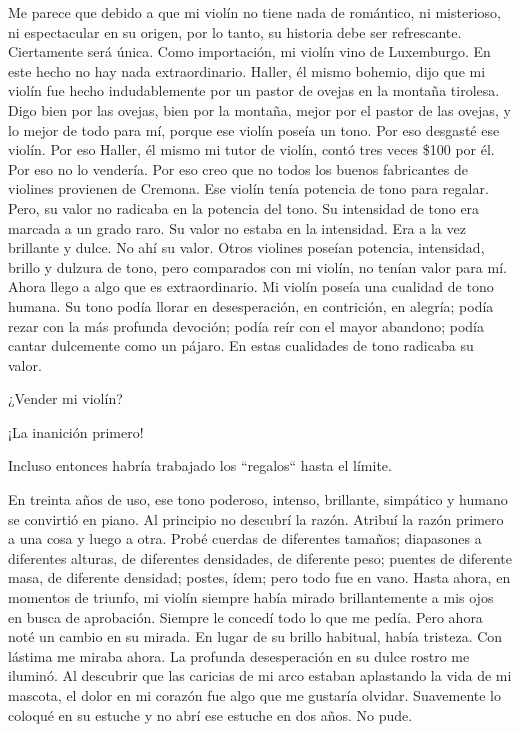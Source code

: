 \documentclass[12pt]{book}
\begin{document}
Me parece que debido a que mi violín no tiene nada de romántico, ni misterioso, ni espectacular en su origen, por lo tanto, su historia debe ser refrescante. Ciertamente será única. Como importación, mi violín vino de Luxemburgo. En este hecho no hay nada extraordinario. Haller, él mismo bohemio, dijo que mi violín fue hecho indudablemente por un pastor de ovejas en la montaña tirolesa. Digo bien por las ovejas, bien por la montaña, mejor por el pastor de las ovejas, y lo mejor de todo para mí, porque ese violín poseía un tono. Por eso desgasté ese violín. Por eso Haller, él mismo mi tutor de violín, contó tres veces \$100 por él. Por eso no lo vendería. Por eso creo que no todos los buenos fabricantes de violines provienen de Cremona. Ese violín tenía potencia de tono para regalar. Pero, su valor no radicaba en la potencia del tono. Su intensidad de tono era marcada a un grado raro. Su valor no estaba en la intensidad. Era a la vez brillante y dulce. No ahí su valor. Otros violines poseían potencia, intensidad, brillo y dulzura de tono, pero comparados con mi violín, no tenían valor para mí. Ahora llego a algo que es extraordinario. Mi violín poseía una cualidad de tono humana. Su tono podía llorar en desesperación, en contrición, en alegría; podía rezar con la más profunda devoción; podía reír con el mayor abandono; podía cantar dulcemente como un pájaro. En estas cualidades de tono radicaba su valor.

¿Vender mi violín?

¡La inanición primero!

Incluso entonces habría trabajado los ``regalos`` hasta el límite.

En treinta años de uso, ese tono poderoso, intenso, brillante, simpático y humano se convirtió en piano. Al principio no descubrí la razón. Atribuí la razón primero a una cosa y luego a otra. Probé cuerdas de diferentes tamaños; diapasones a diferentes alturas, de diferentes densidades, de diferente peso; puentes de diferente masa, de diferente densidad; postes, ídem; pero todo fue en vano. Hasta ahora, en momentos de triunfo, mi violín siempre había mirado brillantemente a mis ojos en busca de aprobación. Siempre le concedí todo lo que me pedía. Pero ahora noté un cambio en su mirada. En lugar de su brillo habitual, había tristeza. Con lástima me miraba ahora. La profunda desesperación en su dulce rostro me iluminó. Al descubrir que las caricias de mi arco estaban aplastando la vida de mi mascota, el dolor en mi corazón fue algo que me gustaría olvidar. Suavemente lo coloqué en su estuche y no abrí ese estuche en dos años. No pude.
\end{document}
